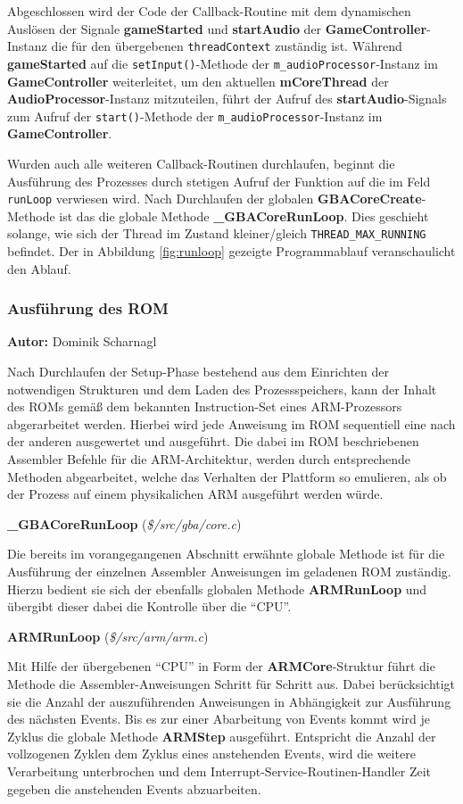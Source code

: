 \documentclass[11pt,a4paper]{scrartcl}
\newcommand{\AutorDominik} {
    \vspace{-4mm}
    \large \textbf{Autor:} Dominik Scharnagl \normalsize
    \vspace{2mm}
}
\newcommand{\paratitlecode}[2] {
    \vspace{5mm}
    \large \textbf{#1} \normalsize(\textit{\${#2}})
    \vspace{2mm}\newline
}
\begin{document}
Abgeschlossen wird der Code der Callback-Routine mit dem dynamischen Ausl\"osen der Signale \textbf{gameStarted} und \textbf{startAudio} der \textbf{GameController}-Instanz die f\"ur den \"ubergebenen \verb|threadContext| zust\"andig ist. W\"ahrend \textbf{gameStarted} auf die \verb|setInput()|-Methode der \verb|m_audioProcessor|-Instanz im \textbf{GameController} weiterleitet, um den aktuellen \textbf{mCoreThread} der \textbf{AudioProcessor}-Instanz mitzuteilen, f\"uhrt der Aufruf des \textbf{startAudio}-Signals zum Aufruf der \verb|start()|-Methode der \verb|m_audioProcessor|-Instanz im \textbf{GameController}.

Wurden auch alle weiteren Callback-Routinen durchlaufen, beginnt die Ausf\"uhrung des Prozesses durch stetigen Aufruf der Funktion auf die im Feld \verb|runLoop| verwiesen wird. Nach Durchlaufen der globalen \textbf{GBACoreCreate}-Methode ist das die globale Methode \textbf{{\_}GBACoreRunLoop}. Dies geschieht solange, wie sich der Thread im Zustand kleiner/gleich \verb|THREAD_MAX_RUNNING| befindet. Der in Abbildung \ref{fig:runloop} gezeigte Programmablauf veranschaulicht den Ablauf.


\newpage
\subsubsection{Ausf\"uhrung des ROM}
\AutorDominik

Nach Durchlaufen der Setup-Phase bestehend aus dem Einrichten der notwendigen Strukturen und dem Laden des Prozessspeichers, kann der Inhalt des ROMs gem\"a{\ss} dem bekannten Instruction-Set eines ARM-Prozessors abgerarbeitet werden. Hierbei wird jede Anweisung im ROM sequentiell eine nach der anderen ausgewertet und ausgef\"uhrt. Die dabei im ROM beschriebenen Assembler Befehle f\"ur die ARM-Architektur, werden durch entsprechende Methoden abgearbeitet, welche das Verhalten der Plattform so emulieren, als ob der Prozess auf einem physikalichen ARM ausgef\"uhrt werden w\"urde.

\paratitlecode{{\_}GBACoreRunLoop}{/src/gba/core.c}
Die bereits im vorangegangenen Abschnitt erw\"ahnte globale Methode ist f\"ur die Ausf\"uhrung der einzelnen Assembler Anweisungen im geladenen ROM zust\"andig. Hierzu bedient sie sich der ebenfalls globalen Methode \textbf{ARMRunLoop} und \"ubergibt dieser dabei die Kontrolle \"uber die \enquote{CPU}.

\paratitlecode{ARMRunLoop}{/src/arm/arm.c}
Mit Hilfe der \"ubergebenen \enquote{CPU} in Form der \textbf{ARMCore}-Struktur f\"uhrt die Methode die Assembler-Anweisungen Schritt f\"ur Schritt aus. Dabei ber\"ucksichtigt sie die Anzahl der auszuf\"uhrenden Anweisungen in Abh\"angigkeit zur Ausf\"uhrung des n\"achsten Events. Bis es zur einer Abarbeitung von Events kommt wird je Zyklus die globale Methode \textbf{ARMStep} ausgef\"uhrt. Entspricht die Anzahl der vollzogenen Zyklen dem Zyklus eines anstehenden Events, wird die weitere Verarbeitung unterbrochen und dem Interrupt-Service-Routinen-Handler Zeit gegeben die anstehenden Events abzuarbeiten.
\end{document}
